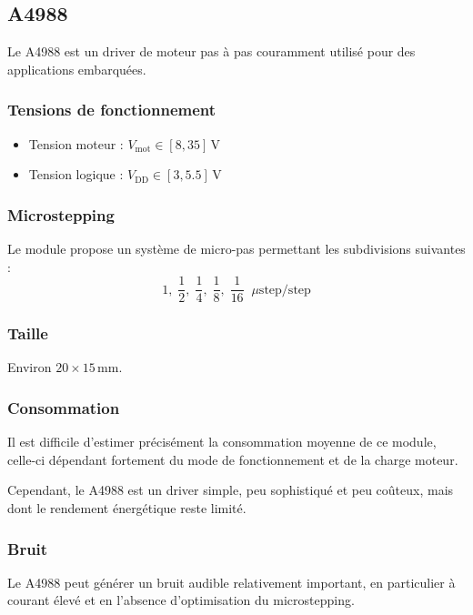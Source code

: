 \subsection{A4988}

Le A4988 \cite{A4988_datasheet} est un driver de moteur pas à pas couramment utilisé pour des applications embarquées.

\subsubsection{Tensions de fonctionnement}

\begin{itemize}
    \item Tension moteur : $V_{\mathrm{mot}} \in [8, 35]\,\mathrm{V}$
    \item Tension logique : $V_{\mathrm{DD}} \in [3, 5.5]\,\mathrm{V}$
\end{itemize}

\subsubsection{Microstepping}

Le module propose un système de micro-pas permettant les subdivisions suivantes :
$$
1,\; \frac{1}{2},\; \frac{1}{4},\; \frac{1}{8},\; \frac{1}{16} \;\; \mu\mathrm{step/step}
$$

\subsubsection{Taille}

Environ $20 \times 15\,\mathrm{mm}$.

\subsubsection{Consommation}

Il est difficile d'estimer précisément la consommation moyenne de ce module, celle-ci dépendant fortement du mode de fonctionnement et de la charge moteur.

Cependant, le A4988 est un driver simple, peu sophistiqué et peu coûteux, mais dont le rendement énergétique reste limité.

\subsubsection{Bruit}

Le A4988 peut générer un bruit audible relativement important, en particulier à courant élevé et en l'absence d'optimisation du microstepping.

